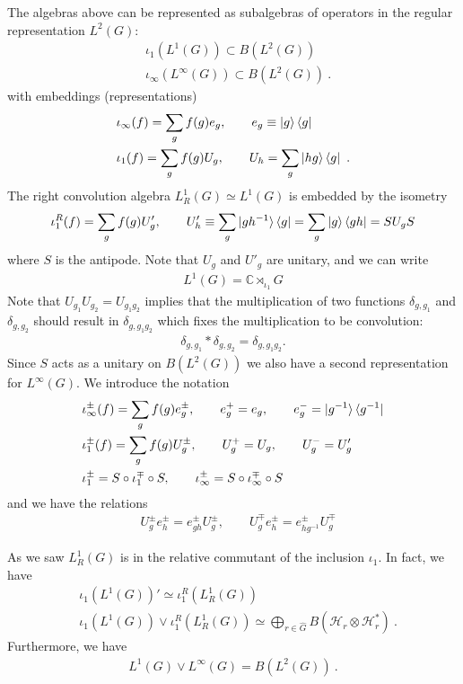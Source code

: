 \documentclass[11pt]{article}
\newcommand{\mH}{\mathcal{H}}
\newcommand{\nn}{\nonumber}
\begin{document}
The algebras above can be represented as subalgebras of operators in the regular representation $L^2(G)$:
\begin{align}
&\iota_1(L^1(G))\subset B(L^2(G))\nn\\
&\iota_\infty(L^\infty(G))\subset B(L^2(G))\ .
\end{align}
with embeddings (representations)
\begin{align}
    &\iota_\infty(f)=\sum_g f(g) e_g,\qquad e_g\equiv \ket{g}\bra{g}\nn\\
    &\iota_1(f)=\sum_g f(g) U_g, \qquad U_h=\sum_g \ket{h g}\bra{g}\ .
\end{align}
The right convolution algebra $L^1_R(G)\simeq L^1(G)$ is embedded by the isometry
\begin{align}
    \iota_1^R(f)=\sum_g f(g) U'_g, \qquad U'_h\equiv \sum_g \ket{g h^{-1}}\bra{g}=\sum_g \ket{g}\bra{g h}=S U_g S
\end{align}
where $S$ is the antipode. Note that $U_g$ and $U'_g$ are unitary, and we can write
\begin{align}
    L^1(G)=\mathbb{C}\rtimes_{\iota_1} G
\end{align}
Note that $U_{g_1}U_{g_2}=U_{g_1g_2}$ implies that the multiplication of two functions $\delta_{g,g_1}$ and $\delta_{g,g_2}$ should result in $\delta_{g,g_1g_2}$ which fixes the multiplication to be convolution:
\begin{align}
 \delta_{g,g_1}*\delta_{g,g_2}=\delta_{g,g_1g_2}.   
\end{align}
Since $S$ acts as a unitary on $B(L^2(G))$ we also have a second representation for $L^\infty(G)$. We introduce the notation
\begin{align}
    &\iota^\pm_\infty(f)=\sum_g f(g) e_g^\pm, \qquad e_g^+=e_g,\qquad  e_g^-=\ket{g^{-1}}\bra{g^{-1}}\nn\\
    &\iota^\pm_1(f)=\sum_g f(g) U_g^\pm, \qquad U_g^+=U_g, \qquad U_g^-=U'_g\nn\\
    &\iota_1^\pm=S\circ \iota_1^\mp\circ S,\qquad \iota_\infty^\pm=S\circ \iota_\infty^\mp\circ S
\end{align}
and we have the relations
\begin{align}
    &U^\pm_g e_h^\pm=e^\pm_{g h}U_g^\pm,\qquad U^\mp_g e_h^\pm=e^\pm_{h g^{-1}} U_g^{\mp}
\end{align}

As we saw $L^1_R(G)$ is in the relative commutant of the inclusion $\iota_1$. 
In fact, we have
\begin{align}
    &\iota_1(L^1(G))'\simeq \iota_1^R(L^1_R(G))\nn\\
    &\iota_1(L^1(G))\vee \iota_1^R(L^1_R(G))\simeq
    \bigoplus_{r\in\hat G}B(\mH_r\otimes\mH_r^*)\ .
\end{align}
Furthermore, we have
\begin{align}
    L^1(G)\vee L^\infty(G)=B(L^2(G))\ .
\end{align}
\end{document}
